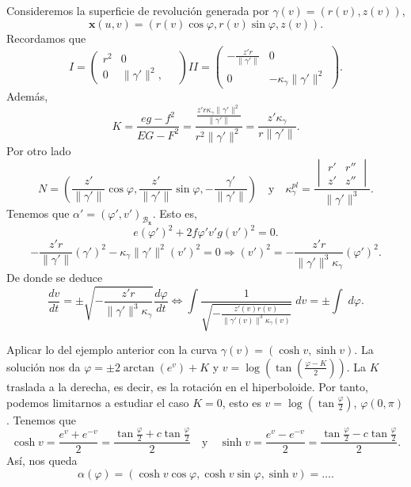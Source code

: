 \begin{eg}
Consideremos la superficie de revolución generada por $\displaystyle \gamma\left(v\right)=\left(r\left(v\right), z\left(v\right)\right) $, 
\[ \textbf{x} \left(u,v\right)=\left(r\left(v\right)\cos \varphi, r\left(v\right)\sin \varphi, z\left(v\right)\right) .\]
Recordamos que 
\[ I = \begin{pmatrix} r^{2} & 0 \\ 0 & \|\gamma'\|^{2}, \quad \end{pmatrix}II = \begin{pmatrix} -\frac{z'r}{\|\gamma'\|} & 0 \\ 0 & -\kappa_{\gamma }\|\gamma'\|^{2} \end{pmatrix} .\]
Además, 
\[K = \frac{eg-f^{2}}{EG-F^{2}}=\frac{\frac{z'r\kappa_{\gamma }\|\gamma'\|^{2}}{\|\gamma'\|}}{r^{2}\|\gamma'\|^{2}}=\frac{z'\kappa_{\gamma }}{r\|\gamma'\|} .\]
Por otro lado
\[N = \left(\frac{z'}{\|\gamma'\|}\cos \varphi, \frac{z'}{\|\gamma'\|}\sin \varphi, -\frac{\gamma'}{\|\gamma'\|}\right)\quad \text{y} \quad \kappa^{pl}_{\gamma } = \frac{\begin{vmatrix} r' & r'' \\ z' & z'' \end{vmatrix} }{\|\gamma'\|^{3}} .\]
Tenemos que $\displaystyle \alpha' = \left(\varphi', v'\right)_{\mathcal{B}_{ \textbf{x} }} $. Esto es, 
\[e\left(\varphi'\right)^{2} + 2f\varphi' v' g\left(v'\right)^{2}=0 .\]
\[ -\frac{z'r}{\|\gamma'\|}\left(\gamma'\right)^{2}-\kappa_{\gamma }\|\gamma'\|^{2}\left(v'\right)^{2}=0 \Rightarrow \left(v'\right)^{2} = -\frac{z'r}{\|\gamma'\|^{3}\kappa_{\gamma }}\left(\varphi'\right)^{2}.\]
De donde se deduce
\[\frac{dv}{dt}=\pm \sqrt{-\frac{z'r}{\|\gamma'\|^{3}\kappa_{\gamma }}}\frac{d\varphi}{dt} \iff \int \frac{1}{\sqrt{-\frac{z'\left(v\right)r\left(v\right)}{\|\gamma'\left(v\right)\|^{3}\kappa_{\gamma }\left(v\right)}}} \; dv = \pm \int  \; d\varphi .\]
\end{eg}
\begin{eg}[Hiperboloide]
	Aplicar lo del ejemplo anterior con la curva $\displaystyle \gamma\left(v\right)=\left(\cosh v, \sinh v\right) $. 
	La solución nos da $\displaystyle \varphi = \pm 2\arctan\left(e^{v}\right) + K $ y $\displaystyle v = \log\left(\tan\left(\frac{\varphi-K}{2}\right)\right) $. La $\displaystyle K $ traslada a la derecha, es decir, es la rotación en el hiperboloide. Por tanto, podemos limitarnos a estudiar el caso $\displaystyle K = 0 $, esto es $\displaystyle v = \log\left(\tan \frac{\varphi}{2}\right) $, $\displaystyle \varphi\left(0, \pi \right) $. Tenemos que 
	\[\cosh v=\frac{e^{v}+e^{-v}}{2}=\frac{\tan\frac{\varphi}{2}+c\tan\frac{\varphi}{2}}{2} \quad \text{y} \quad \sinh v = \frac{e^{v}-e^{-v}}{2}=\frac{\tan\frac{\varphi}{2}-c\tan\frac{\varphi}{2}}{2} .\]
	Así, nos queda
	\[\alpha\left(\varphi\right)=\left(\cosh v \cos \varphi, \cosh v \sin \varphi, \sinh v\right)= \ldots .\]
\end{eg}
